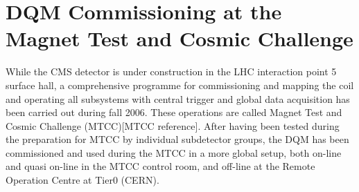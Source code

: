 \documentclass[a4paper]{cmspaper}
\begin{document}
\section{DQM Commissioning at the Magnet Test and Cosmic Challenge} \label{sec:dqmcommissioning}

While the CMS detector is under construction in the LHC interaction point 5 surface hall, a comprehensive 
programme for commissioning and mapping the coil and operating all subsystems with central trigger and global 
data acquisition has been carried out during fall 2006. These operations are called Magnet Test and Cosmic 
Challenge (MTCC)[MTCC reference]. After having been tested during the preparation for MTCC by individual 
subdetector groups, the DQM has been commissioned and used during the MTCC in a more global setup,
both on-line and quasi on-line in the MTCC control room, and off-line at the Remote Operation Centre at Tier0 (CERN). 
\end{document}
